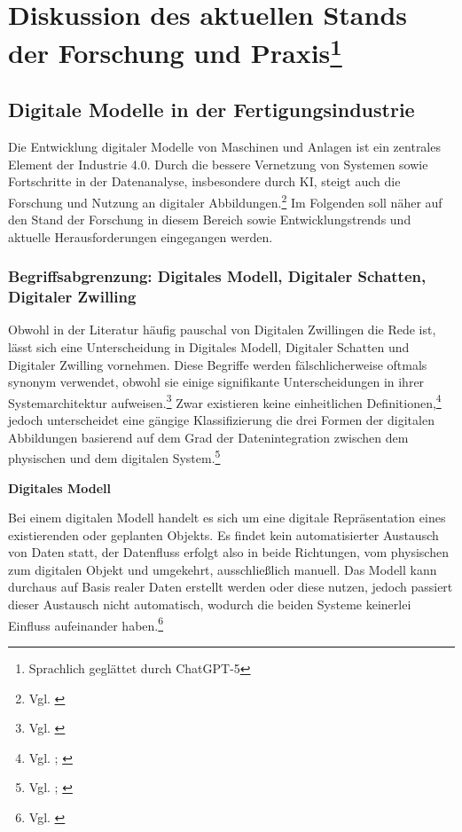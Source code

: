 \chapter[Diskussion des aktuellen Stands der Forschung und Praxis]{Diskussion des aktuellen Stands der Forschung und Praxis\footnote{Sprachlich geglättet durch ChatGPT-5}}
\label{chapter:Stand_Forschung_und_Praxis}

\section{Digitale Modelle in der Fertigungsindustrie}

Die Entwicklung digitaler Modelle von Maschinen und Anlagen ist ein zentrales Element der Industrie 4.0. Durch die bessere Vernetzung von Systemen sowie Fortschritte in der Datenanalyse, insbesondere durch KI, steigt auch die Forschung und Nutzung an digitaler Abbildungen.\footnote{Vgl. \cite[S. 108952]{fuller_digital_2020}} Im Folgenden soll näher auf den Stand der Forschung in diesem Bereich sowie Entwicklungstrends und aktuelle Herausforderungen eingegangen werden.

\subsection{Begriffsabgrenzung: Digitales Modell, Digitaler Schatten, Digitaler Zwilling}
Obwohl in der Literatur häufig pauschal von Digitalen Zwillingen die Rede ist, lässt sich eine Unterscheidung in Digitales Modell, Digitaler Schatten und Digitaler Zwilling vornehmen. Diese Begriffe werden fälschlicherweise oftmals synonym verwendet, obwohl sie einige signifikante Unterscheidungen in ihrer Systemarchitektur aufweisen.\footnote{Vgl. \cite[S. 1017]{kritzinger_digital_2018}} Zwar existieren keine einheitlichen Definitionen,\footnote{Vgl. \cite[S. 350]{liu_review_2021}; \cite[S. 108953]{fuller_digital_2020}} jedoch unterscheidet eine gängige Klassifizierung die drei Formen der digitalen Abbildungen basierend auf dem Grad der Datenintegration zwischen dem physischen und dem digitalen System.\footnote{Vgl. \cite[S. 108953]{fuller_digital_2020}; \cite[S. 1017 f.]{kritzinger_digital_2018}}

\textbf{Digitales Modell}

Bei einem digitalen Modell handelt es sich um eine digitale Repräsentation eines existierenden oder geplanten Objekts. Es findet kein automatisierter Austausch von Daten statt, der Datenfluss erfolgt also in beide Richtungen, vom physischen zum digitalen Objekt und umgekehrt, ausschließlich manuell. Das Modell kann durchaus auf Basis realer Daten erstellt werden oder diese nutzen, jedoch passiert dieser Austausch nicht automatisch, wodurch die beiden Systeme keinerlei Einfluss aufeinander haben.\footnote{Vgl. \cite[S. 108953]{fuller_digital_2020}}

